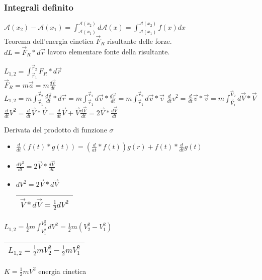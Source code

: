 \documentclass{book}
\begin{document}
\subsubsection{Integrali definito}
$\mathcal{A}(x_2)-\mathcal{A}(x_1)=\int^{\mathcal{A}(x_2)}_{\mathcal{A}(x_1)}d\mathcal{A}(x)=\int^{\mathcal{A}(x_2)}_{\mathcal{A}(x_1)}f(x)dx$\\
Teorema dell'energia cinetica $\overrightarrow{F}_R$ risultante delle forze.\\
$dL=\overrightarrow{F}_R*d\overrightarrow{r}$ lavoro elementare fonte della risultante.
\begin{multicols}{2}
	$L_{1,2}=\int^{\overrightarrow{r}_2}_{\overrightarrow{r}_1}F_R*d\overrightarrow{r}$\\ 
	$\overrightarrow{F}_R=m\overrightarrow{a}=m\frac{d\overrightarrow{v}}{dt}$\\
	$L_{1,2}=m\int^{\overrightarrow{r}_2}_{\overrightarrow{r}_1}\frac{d\overrightarrow{v}}{dt}*d\overrightarrow{r}=m\int^{\overrightarrow{r}_2}_{\overrightarrow{r}_1}d\overrightarrow{v}*\frac{d\overrightarrow{r}}{dt}=m\int^{\overrightarrow{r}_2}_{\overrightarrow{r}_1}d\overrightarrow{v}*\overrightarrow{v}$
	$\frac{d}{dt}v^2=\frac{d}{dt}\overrightarrow{v}*\overrightarrow{v}=m\int^{
		\overrightarrow{V}_2}_{\overrightarrow{V}_1}d\overrightarrow{V}*\overrightarrow{V}$\\
	$\frac{d}{dt}V^2=\frac{d}{dt}\overrightarrow{V}*\overrightarrow{V}=\frac{d}{dt}\overrightarrow{V}
	+\overrightarrow{V}\frac{d\overrightarrow{V}}{dt}=2\overrightarrow{V}*\frac{d\overrightarrow{V}}{dt}$
\end{multicols}
Derivata del prodotto di funzione $\sigma$
\begin{itemize}
	\item $\frac{d}{dt}(f(t)*g(t))=(\frac{d}{at}*f(t))g(r)+f(t)*\frac{d}{dt}g(t)$
	\item $\frac{dV^2}{dt}=2\overrightarrow{V}*\frac{d\overrightarrow{V}}{dt}$
	\item $dV^2=2\overrightarrow{V}*d\overrightarrow{V}$
		\begin{tabular}{|l|}
			\hline
				$\overrightarrow{V}*d\overrightarrow{V}=\frac{1}{2}dV^2$\\
			\hline
		\end{tabular}
\end{itemize}
$L_{1,2}=\frac{1}{2}m\int^{V^2_2}_{V^2_1}dV^2=\frac{1}{2}m(V^2_2-V^2_1)$\\
\begin{tabular}{|l|}
	\hline
		$L_{1,2}=\frac{1}{2}mV^2_2-\frac{1}{2}mV^2_1$
	\\\hline
\end{tabular}
$K=\frac{1}{2}mV^2$ energia cinetica\\
\end{document}

